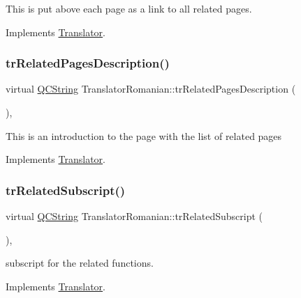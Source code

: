 This is put above each page as a link to all related pages. 

Implements \mbox{\hyperlink{class_translator}{Translator}}.

\mbox{\label{class_translator_romanian_aea2b7ac808d24c30875c78a9b34b685d}} 
\subsubsection{\texorpdfstring{trRelatedPagesDescription()}{trRelatedPagesDescription()}}
{\footnotesize\ttfamily virtual \mbox{\hyperlink{class_q_c_string}{Q\+C\+String}} Translator\+Romanian\+::tr\+Related\+Pages\+Description (\begin{DoxyParamCaption}{ }\end{DoxyParamCaption})\hspace{0.3cm}{\ttfamily [inline]}, {\ttfamily [virtual]}}

This is an introduction to the page with the list of related pages 

Implements \mbox{\hyperlink{class_translator}{Translator}}.

\mbox{\label{class_translator_romanian_aa447af22e7c071ff920337ab044cc373}} 
\subsubsection{\texorpdfstring{trRelatedSubscript()}{trRelatedSubscript()}}
{\footnotesize\ttfamily virtual \mbox{\hyperlink{class_q_c_string}{Q\+C\+String}} Translator\+Romanian\+::tr\+Related\+Subscript (\begin{DoxyParamCaption}{ }\end{DoxyParamCaption})\hspace{0.3cm}{\ttfamily [inline]}, {\ttfamily [virtual]}}

subscript for the related functions. 

Implements \mbox{\hyperlink{class_translator}{Translator}}.

\mbox{\label{class_translator_romanian_ad84932f9b3d570ee05cf5735f84ebd3d}} 
